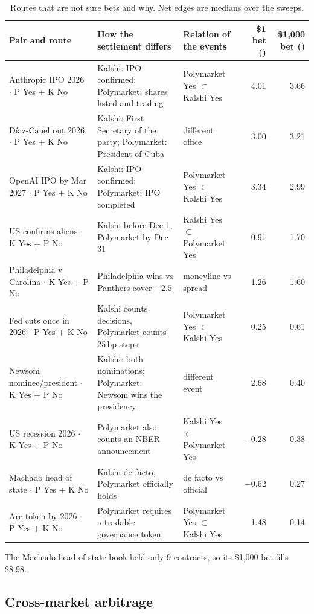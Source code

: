 \documentclass[5p,letterpaper]{elsarticle}
\newcommand{\cent}{\textcent}
\begin{document}
\begin{table}[t]
\caption{Routes that are not sure bets and why. Net edges are medians over the sweeps.}\label{tab:notsure}
\footnotesize
\begin{tabularx}{\textwidth}{@{}lLlrr@{}}
\toprule
Pair and route & How the settlement differs & Relation of the events & \$1 bet (\cent) & \$1,000 bet (\cent) \\
\midrule
Anthropic IPO 2026 $\cdot$ P Yes + K No & Kalshi: IPO confirmed; Polymarket: shares listed and trading & Polymarket Yes $\subset$ Kalshi Yes & 4.01 & 3.66 \\
D\'iaz-Canel out 2026 $\cdot$ P Yes + K No & Kalshi: First Secretary of the party; Polymarket: President of Cuba & different office & 3.00 & 3.21 \\
OpenAI IPO by Mar 2027 $\cdot$ P Yes + K No & Kalshi: IPO confirmed; Polymarket: IPO completed & Polymarket Yes $\subset$ Kalshi Yes & 3.34 & 2.99 \\
US confirms aliens $\cdot$ K Yes + P No & Kalshi before Dec 1, Polymarket by Dec 31 & Kalshi Yes $\subset$ Polymarket Yes & 0.91 & 1.70 \\
Philadelphia v Carolina $\cdot$ K Yes + P No & Philadelphia wins vs Panthers cover $-2.5$ & moneyline vs spread & 1.26 & 1.60 \\
Fed cuts once in 2026 $\cdot$ P Yes + K No & Kalshi counts decisions, Polymarket counts 25\,bp steps & Polymarket Yes $\subset$ Kalshi Yes & 0.25 & 0.61 \\
Newsom nominee/president $\cdot$ K Yes + P No & Kalshi: both nominations; Polymarket: Newsom wins the presidency & different event & 2.68 & 0.40 \\
US recession 2026 $\cdot$ K Yes + P No & Polymarket also counts an NBER announcement & Kalshi Yes $\subset$ Polymarket Yes & $-0.28$ & 0.38 \\
Machado head of state $\cdot$ P Yes + K No & Kalshi de facto, Polymarket officially holds & de facto vs official & $-0.62$ & 0.27 \\
Arc token by 2026 $\cdot$ P Yes + K No & Polymarket requires a tradable governance token & Polymarket Yes $\subset$ Kalshi Yes & 1.48 & 0.14 \\
\bottomrule
\end{tabularx}
\par\smallskip\raggedright The Machado head of state book held only 9 contracts, so its \$1,000 bet fills \$8.98.
\end{table}

\subsection{Cross-market arbitrage}
\end{document}
